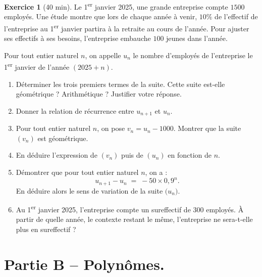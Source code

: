 \documentclass{exam}
\theoremstyle{definition}
\newtheorem{exercice}{Exercice}
\begin{document}
\vfill

\begin{exercice}[40 min]
  Le 1\textsuperscript{er} janvier 2025, une grande entreprise compte \(1500\) employés.
  Une étude montre que lors de chaque année à venir, \(10\%\) de l'effectif de l'entreprise au 1\textsuperscript{er} janvier partira à la retraite au cours de l'année. Pour ajuster ses effectifs à ses besoins, l'entreprise embauche \(100\) jeunes dans l'année.

  Pour tout entier naturel \(n\), on appelle \(u_n\) le nombre d'employés de l'entreprise le 1\textsuperscript{er} janvier de l'année \((2025 + n)\).

  \begin{enumerate}
    \item Déterminer les trois premiers termes de la suite.
      Cette suite est-elle géométrique ? Arithmétique ? Justifier votre réponse.

    \item Donner la relation de récurrence entre \(u_{n+1}\) et \(u_n\).

    \item Pour tout entier naturel \(n\), on pose \(v_n = u_n - 1000\).
      Montrer que la suite \((v_n)\) est géométrique.

    \item En déduire l'expression de \((v_n)\) puis de \((u_n)\) en fonction de \(n\).

    \item Démontrer que pour tout entier naturel \(n\), on a :
      \[
        u_{n+1} - u_n \;=\; -50 \times 0{,}9^n.
      \]
      En déduire alors le sens de variation de la suite \(\bigl(u_n\bigr)\).

    \item Au 1\textsuperscript{er} janvier 2025, l'entreprise compte un sureffectif de \(300\) employés.
      À partir de quelle année, le contexte restant le même, l'entreprise ne sera-t-elle plus en sureffectif ?
  \end{enumerate}
\end{exercice}

\vfill

\newpage

\section*{Partie B -- Polynômes.}
\end{document}
